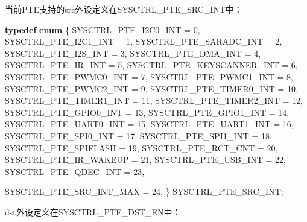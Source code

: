 \documentclass[
  12pt,
]{book}
\newenvironment{Shaded}{\begin{snugshade}}{\end{snugshade}}
\newcommand{\DecValTok}[1]{\textcolor[rgb]{0.00,0.00,0.81}{#1}}
\newcommand{\KeywordTok}[1]{\textcolor[rgb]{0.13,0.29,0.53}{\textbf{#1}}}
\newcommand{\NormalTok}[1]{#1}
\begin{document}
当前PTE支持的src外设定义在SYSCTRL\_PTE\_SRC\_INT中：

\begin{Shaded}
\begin{Highlighting}[]
\KeywordTok{typedef} \KeywordTok{enum}
\NormalTok{\{}
\NormalTok{    SYSCTRL_PTE_I2C0_INT       = }\DecValTok{0}\NormalTok{,}
\NormalTok{    SYSCTRL_PTE_I2C1_INT       = }\DecValTok{1}\NormalTok{,}
\NormalTok{    SYSCTRL_PTE_SARADC_INT     = }\DecValTok{2}\NormalTok{,}
\NormalTok{    SYSCTRL_PTE_I2S_INT        = }\DecValTok{3}\NormalTok{,}
\NormalTok{    SYSCTRL_PTE_DMA_INT        = }\DecValTok{4}\NormalTok{,}
\NormalTok{    SYSCTRL_PTE_IR_INT         = }\DecValTok{5}\NormalTok{,}
\NormalTok{    SYSCTRL_PTE_KEYSCANNER_INT = }\DecValTok{6}\NormalTok{,}
\NormalTok{    SYSCTRL_PTE_PWMC0_INT      = }\DecValTok{7}\NormalTok{,}
\NormalTok{    SYSCTRL_PTE_PWMC1_INT      = }\DecValTok{8}\NormalTok{,}
\NormalTok{    SYSCTRL_PTE_PWMC2_INT      = }\DecValTok{9}\NormalTok{,}
\NormalTok{    SYSCTRL_PTE_TIMER0_INT     = }\DecValTok{10}\NormalTok{,}
\NormalTok{    SYSCTRL_PTE_TIMER1_INT     = }\DecValTok{11}\NormalTok{,}
\NormalTok{    SYSCTRL_PTE_TIMER2_INT     = }\DecValTok{12}\NormalTok{,}
\NormalTok{    SYSCTRL_PTE_GPIO0_INT      = }\DecValTok{13}\NormalTok{,}
\NormalTok{    SYSCTRL_PTE_GPIO1_INT      = }\DecValTok{14}\NormalTok{,}
\NormalTok{    SYSCTRL_PTE_UART0_INT      = }\DecValTok{15}\NormalTok{,}
\NormalTok{    SYSCTRL_PTE_UART1_INT      = }\DecValTok{16}\NormalTok{,}
\NormalTok{    SYSCTRL_PTE_SPI0_INT       = }\DecValTok{17}\NormalTok{,}
\NormalTok{    SYSCTRL_PTE_SPI1_INT       = }\DecValTok{18}\NormalTok{,}
\NormalTok{    SYSCTRL_PTE_SPIFLASH       = }\DecValTok{19}\NormalTok{,}
\NormalTok{    SYSCTRL_PTE_RCT_CNT        = }\DecValTok{20}\NormalTok{,}
\NormalTok{    SYSCTRL_PTE_IR_WAKEUP      = }\DecValTok{21}\NormalTok{,}
\NormalTok{    SYSCTRL_PTE_USB_INT        = }\DecValTok{22}\NormalTok{,}
\NormalTok{    SYSCTRL_PTE_QDEC_INT       = }\DecValTok{23}\NormalTok{,}

\NormalTok{    SYSCTRL_PTE_SRC_INT_MAX    = }\DecValTok{24}\NormalTok{,}
\NormalTok{\} SYSCTRL_PTE_SRC_INT;}
\end{Highlighting}
\end{Shaded}

dst外设定义在SYSCTRL\_PTE\_DST\_EN中：
\end{document}
